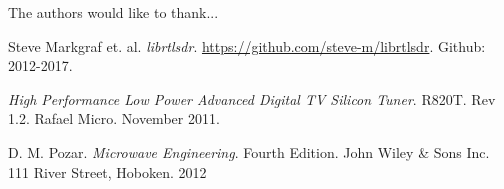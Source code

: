\documentclass[conference]{IEEEtran}
\begin{document}
The authors would like to thank...







%
%
%
\begin{thebibliography}{1}

Steve Markgraf et. al. \emph{librtlsdr}. \url{https://github.com/steve-m/librtlsdr}. Github: 2012-2017.

\emph{High Performance Low Power Advanced Digital TV Silicon Tuner}. R820T. Rev 1.2. Rafael Micro. November 2011.

D. M. Pozar. \emph{Microwave Engineering}. Fourth Edition. John Wiley \& Sons Inc. 111 River Street, Hoboken. 2012

\end{thebibliography}




\end{document}
